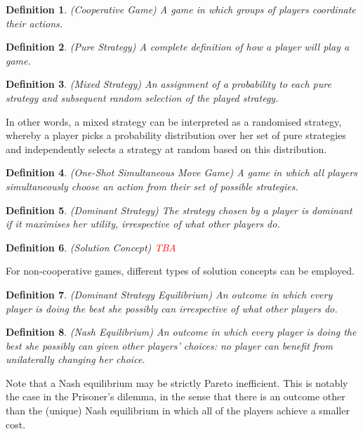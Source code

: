 \documentclass{article}
\newtheorem{definition}{Definition}
\begin{document}
\begin{definition}
(Cooperative Game) A game in which groups of players coordinate their actions.
\end{definition}

\begin{definition}
(Pure Strategy) A complete definition of how a player will play a game.
\end{definition}

\begin{definition}
(Mixed Strategy) An assignment of a probability to each pure strategy and subsequent random selection of the played strategy.
\end{definition}

In other words, a mixed strategy can be interpreted as a randomised strategy, whereby a player picks a probability distribution over her set of pure strategies and independently selects a strategy at random based on this distribution.

\begin{definition}
(One-Shot Simultaneous Move Game) A game in which all players simultaneously choose an action from their set of possible strategies.
\end{definition}

\begin{definition}
(Dominant Strategy) The strategy chosen by a player is dominant if it maximises her utility, irrespective of what other players do.
\end{definition}

\begin{definition}
(Solution Concept) \textcolor{red}{TBA}
\end{definition}

For non-cooperative games, different types of solution concepts can be employed.

\begin{definition}
(Dominant Strategy Equilibrium) An outcome in which every player is doing the best she possibly can irrespective of what other players do.
\end{definition}

\begin{definition}
(Nash Equilibrium) An outcome in which every player is doing the best she possibly can given other players' choices: no player can benefit from unilaterally changing her choice.
\end{definition}

Note that a Nash equilibrium may be strictly Pareto inefficient. This is notably the case in the Prisoner's dilemma, in the sense that there is an outcome other than the (unique) Nash equilibrium in which all of the players achieve a smaller cost.
\end{document}
